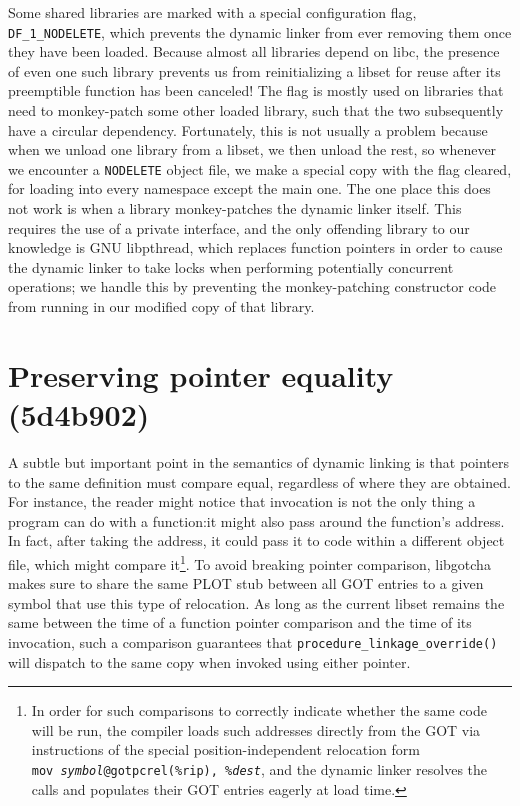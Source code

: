\documentclass[12pt,letterpaper,openright]{report}
\begin{document}
Some shared libraries are marked with a special configuration flag,
\texttt{DF\_1\_NODELETE}, which prevents the dynamic linker from ever removing them
once they have been loaded.  Because almost all libraries depend on libc, the
presence of even one such library prevents us from reinitializing a libset for reuse
after its preemptible function has been canceled!  The flag is mostly used on
libraries that need
to monkey-patch some other loaded library, such that the two subsequently have a
circular dependency.  Fortunately, this is not usually a problem because when we
unload one library from a libset, we then unload the rest, so whenever we encounter a
\texttt{NODELETE} object file, we make a special copy with the flag cleared, for
loading into every namespace except the main one.  The one place this does not work
is when a library monkey-patches the dynamic linker itself.  This
requires the use of a private interface, and the only offending library to our
knowledge is GNU libpthread, which replaces function pointers in order to cause the
dynamic linker to take locks when performing potentially concurrent operations; we
handle this by preventing the monkey-patching constructor code from running in our
modified copy of that library.


\section{Preserving pointer equality (5d4b902)}

A subtle but important point in the semantics of dynamic linking is that pointers to
the same definition must compare equal, regardless of where they are obtained.  For
instance,
the reader might notice that invocation is not the only thing a program can do with a
function:\@ it might also pass around the function's address.  In fact, after taking
the address, it could pass it to code within a different object file, which might
compare it\footnote{In order for such comparisons to correctly indicate whether the
same code will be run, the compiler loads such addresses directly from the GOT via
instructions of the special position-independent relocation form
\texttt{mov~\textit{symbol}@gotpcrel(\%rip),~\%\textit{dest}}, and the dynamic linker
resolves the calls and populates their GOT entries eagerly at load time.}.  To avoid
breaking pointer comparison, libgotcha makes sure to share the same PLOT
stub between all GOT entries to a given symbol that use this type of
relocation.  As long as the current libset remains the same between the time of a
function pointer comparison and the time of its invocation, such a comparison
guarantees that \texttt{procedure\_linkage\_override()} will dispatch to the same
copy when invoked using either pointer.
\end{document}

